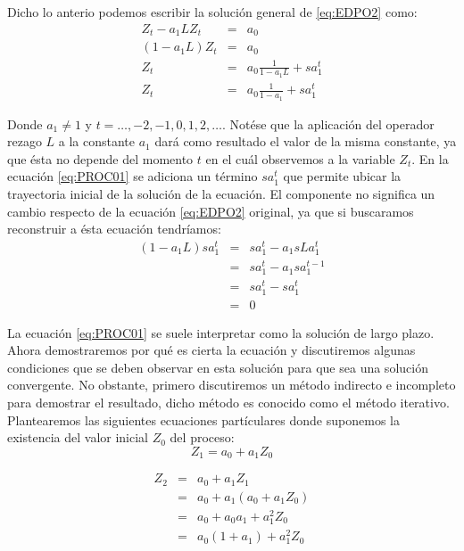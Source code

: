 \documentclass[
]{book}
\begin{document}
Dicho lo anterio podemos escribir la solución general de \eqref{eq:EDPO2} como:
\begin{eqnarray}
    Z_t - a_1 L Z_t & = & a_0 \nonumber \\
    (1 - a_1 L)Z_t & = & a_0 \nonumber \\
    Z_t & = & a_0 \frac{1}{1 - a_1 L} + s a^t_1 \nonumber \\
    Z_t & = & a_0 \frac{1}{1 - a_1} + s a^t_1
    \label{eq:PROC01}
\end{eqnarray}

Donde \(a_1 \neq 1\) y \(t = \ldots, -2, -1, 0, 1, 2, \ldots\). Notése que la aplicación del operador rezago \(L\) a la constante \(a_1\) dará como resultado el valor de la misma constante, ya que ésta no depende del momento \(t\) en el cuál observemos a la variable \(Z_t\). En la ecuación \eqref{eq:PROC01} se adiciona un término \(s a^t_1\) que permite ubicar la trayectoria inicial de la solución de la ecuación. El componente no significa un cambio respecto de la ecuación \eqref{eq:EDPO2} original, ya que si buscaramos reconstruir a ésta ecuación tendríamos:
\begin{eqnarray}
    (1 - a_1 L) s a^t_1 & = & s a^t_1 - a_1 s L a^{t}_1 \nonumber \\
    & = & s a^t_1 - a_1 s a^{t - 1}_1 \nonumber \\
    & = & s a^t_1 - s a^t_1 \nonumber \\
    & = & 0 \nonumber
\end{eqnarray}

La ecuación \eqref{eq:PROC01} se suele interpretar como la solución de largo plazo. Ahora demostraremos por qué es cierta la ecuación y discutiremos algunas condiciones que se deben observar en esta solución para que sea una solución convergente. No obstante, primero discutiremos un método indirecto e incompleto para demostrar el resultado, dicho método es conocido como el método iterativo. Plantearemos las siguientes ecuaciones partículares donde suponemos la existencia del valor inicial \(Z_0\) del proceso:
\begin{equation*}
    Z_1 = a_0 + a_1 Z_0
\end{equation*}

\begin{eqnarray*}
Z_2 & = & a_0 + a_1 Z_1 \\
    & = & a_0 + a_1 (a_0 + a_1 Z_0) \\
    & = & a_0 +  a_0 a_1 + a^2_1 Z_0 \\
    & = & a_0 (1 + a_1) + a^2_1 Z_0
\end{eqnarray*}
\end{document}

